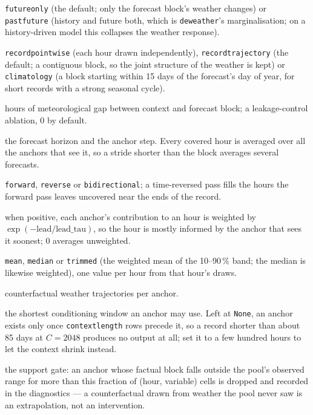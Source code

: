 \documentclass[11pt]{report}
\newcommand{\nosep}{\setlength{\itemsep}{0pt}\setlength{\parskip}{0pt}\setlength{\topsep}{2pt}}
\newcommand{\codeunderscore}{\textunderscore\allowbreak}
\newcommand{\code}[1]{\texttt{\let\_\codeunderscore #1}}
\begin{document}
\begin{description}\nosep
  \item[intervene] \code{future\_only} (the default; only the forecast block's
        weather changes) or \code{past\_future} (history and future both, which is
        \code{deweather}'s marginalisation; on a history-driven model this collapses
        the weather response).
  \item[pool] \code{record\_pointwise} (each hour drawn independently),
        \code{record\_trajectory} (the default; a contiguous block, so the joint
        structure of the weather is kept) or \code{climatology} (a block starting
        within 15 days of the forecast's day of year, for short records with a strong
        seasonal cycle).
  \item[gap\_h] hours of meteorological gap between context and forecast block; a
        leakage-control ablation, 0 by default.
  \item[block\_h, stride] the forecast horizon and the anchor step. Every covered
        hour is averaged over all the anchors that see it, so a stride shorter than
        the block averages several forecasts.
  \item[direction] \code{forward}, \code{reverse} or \code{bidirectional}; a
        time-reversed pass fills the hours the forward pass leaves uncovered near the
        ends of the record.
  \item[lead\_tau] when positive, each anchor's contribution to an hour is weighted
        by $\exp(-\text{lead}/\text{lead\_tau})$, so the hour is mostly informed by
        the anchor that sees it soonest; 0 averages unweighted.
  \item[aggregate] \code{mean}, \code{median} or \code{trimmed} (the weighted mean
        of the 10--90\,\% band; the median is likewise weighted), one value per hour
        from that hour's draws.
  \item[n\_resamples] counterfactual weather trajectories per anchor.
  \item[min\_context] the shortest conditioning window an anchor may use. Left at
        \code{None}, an anchor exists only once \code{context\_length} rows precede
        it, so a record shorter than about 85 days at $C = 2048$ produces no output
        at all; set it to a few hundred hours to let the context shrink instead.
  \item[support\_min\_frac] the support gate: an anchor whose factual block falls
        outside the pool's observed range for more than this fraction of
        (hour, variable) cells is dropped and recorded in the diagnostics --- a
        counterfactual drawn from weather the pool never saw is an extrapolation,
        not an intervention.
\end{description}
\end{document}
